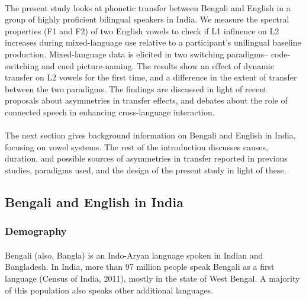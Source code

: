\documentclass[11pt]{article}
\begin{document}
\paragraph{} The present study looks at phonetic transfer between Bengali and English in a group of highly proficient bilingual speakers in India. We measure the spectral properties (F1 and F2) of two English vowels to check if L1 influence on L2 increases during mixed-language use relative to a participant's unilingual baseline production. Mixed-language data is elicited in two switching paradigms-- code-switching and cued picture-naming. The results show an effect of dynamic transfer on L2 vowels for the first time, and a difference in the extent of transfer between the two paradigms. The findings are discussed in light of recent proposals about asymmetries in transfer effects, and debates about the role of connected speech in enhancing cross-language interaction. 
 
\paragraph{}The next section gives background information on Bengali and English in India, focusing on vowel systems. The rest of the introduction  discusses causes, duration, and possible sources of asymmetries in transfer reported in previous studies, paradigms used, and the design of the present study in light of these. 

\subsection{Bengali and English in India}

	\subsubsection{Demography} 
	\paragraph{}Bengali (also, Bangla) is an Indo-Aryan language spoken in Indian and Bangladesh. In India, more than 97 million people speak Bengali as a first language (Census of India, 2011), mostly in the state of West Bengal. A majority of this population also speaks other additional languages.
	
\end{document}
